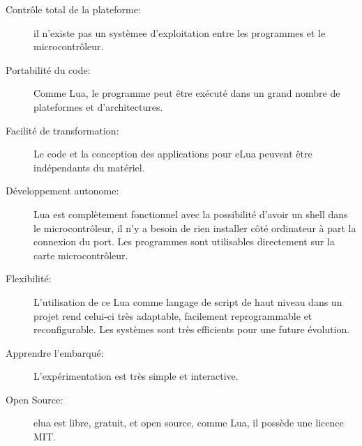 \begin{description}

 \item[Contrôle total de la plateforme:] il n'existe pas un systèmee d'exploitation entre les programmes et le microcontrôleur.

 \item[Portabilité du code:] Comme Lua, le programme peut être exécuté dans un grand nombre de plateformes et d'architectures.

 \item[Facilité de transformation:] Le code et la conception des applications pour eLua peuvent être indépendants du matériel.

 \item[Développement autonome:] Lua est complètement fonctionnel avec la possibilité d'avoir un shell dans le microcontrôleur, il n'y a besoin
de rien installer côté ordinateur à part la connexion du port. Les programmes sont utilisables directement sur la carte microcontrôleur.

 \item[Flexibilité:] L'utilisation de ce Lua comme langage de script de haut niveau dans un projet rend celui-ci très adaptable, facilement
reprogrammable et reconfigurable. Les systèmes sont très efficients pour une future évolution.

 \item[Apprendre l'embarqué: ] L'expérimentation est très simple et interactive.

 \item[Open Source:] elua est libre, gratuit, et open source, comme Lua, il possède une licence MIT.
\end{description}




